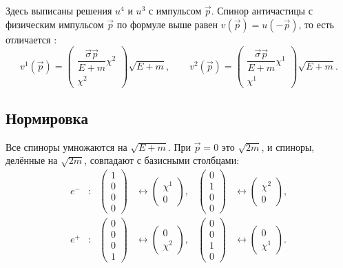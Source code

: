 \documentclass[../final.tex]{subfiles}
\begin{document}
\remark
Здесь выписаны решения $u^{4}$ и $u^{3}$ с импульсом $\vec p$.
Спинор античастицы с физическим импульсом $\vec p$ по формуле выше
равен $v(\vec p)=u(-\vec p)$, то есть отличается :
\begin{equation*}
    v^{1}(\vec p)=
    \begin{pmatrix}
        \dfrac{\vec\sigma\vec p}{E+m}\chi^2\\[0.6em]
        \chi^2
    \end{pmatrix}\sqrt{E+m},
    \qquad
    v^{2}(\vec p)=
    \begin{pmatrix}
        \dfrac{\vec\sigma\vec p}{E+m}\chi^1\\[0.6em]
        \chi^1
    \end{pmatrix}\sqrt{E+m}.
\end{equation*}

\subsection*{Нормировка}

Все спиноры умножаются на $\sqrt{E+m}$. При $\vec p=0$ это $\sqrt{2m}$,
и спиноры, делённые на $\sqrt{2m}$, совпадают с базисными столбцами:
\begin{align*}
    e^-&:&
    \begin{pmatrix}
        1\\0\\0\\0
    \end{pmatrix}
    &\longleftrightarrow
    \begin{pmatrix}
        \chi^1\\0
    \end{pmatrix},
    &
    \begin{pmatrix}
        0\\1\\0\\0
    \end{pmatrix}
    &\longleftrightarrow
    \begin{pmatrix}
        \chi^2\\0
    \end{pmatrix},\\[0.5em]
    e^+&:&
    \begin{pmatrix}
        0\\0\\0\\1
    \end{pmatrix}
    &\longleftrightarrow
    \begin{pmatrix}
        0\\\chi^2
    \end{pmatrix},
    &
    \begin{pmatrix}
        0\\0\\1\\0
    \end{pmatrix}
    &\longleftrightarrow
    \begin{pmatrix}
        0\\\chi^1
    \end{pmatrix}.
\end{align*}
\end{document}
